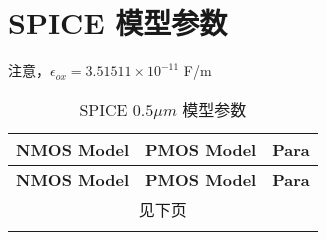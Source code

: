 \documentclass[cn,11pt,chinese,black,simple]{../elegantbook}
\begin{document}
\fi 


\chapter{SPICE 模型参数}

注意，\(\epsilon_{ox} = 3.51511 \times  10^{-11} \) F/m

\begin{longtable}{lll}
    \caption{SPICE \(0.5 \mu m\) 模型参数} \\
    \toprule \textbf{NMOS Model} & \textbf{PMOS Model} & \textbf{Para}                                                                                                            \\
    \midrule
    \endfirsthead
    
    \toprule \textbf{NMOS Model} & \textbf{PMOS Model} & \textbf{Para}                                                                                                            \\
    \midrule
    \endhead

    \hline
    \multicolumn{3}{c}{见下页}\\   
    \bottomrule
    \endfoot


\end{longtable}
\end{document}
